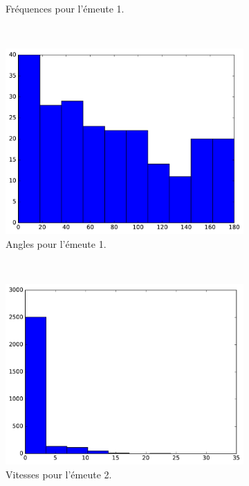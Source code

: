 \begin{figure}[htb]
\begin{subfigure}[t]{\subImgWclicks}
			\caption{Fréquences pour l'émeute 1.}
			\label{fig:riot_frequency}
		\end{subfigure}
		~
		\begin{subfigure}[t]{\subImgWclicks}
			\centering
			\includegraphics[width=\textwidth]{figures/ch3/riot_angle}
			\caption{Angles pour l'émeute 1.}
			\label{fig:riot_angle}
		\end{subfigure}
		~
		\begin{subfigure}[t]{\subImgWclicks}
			\centering
			\includegraphics[width=\textwidth]{figures/ch3/riot2a_speed}
			\caption{Vitesses pour l'émeute 2.}
			\label{fig:riot2a_speed}
		\end{subfigure}
		~
		\begin{subfigure}[t]{\subImgWclicks}

\end{subfigure}
\end{figure}
